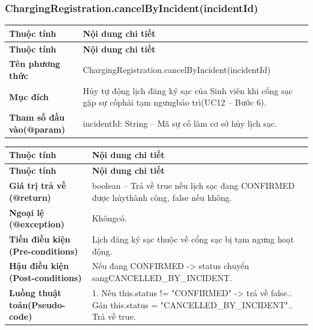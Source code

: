\subsubsection{ChargingRegistration.cancelByIncident(incidentId)}
\begin{longtable}{|L{0.24\textwidth}|L{0.70\textwidth}|}
\hline
\textbf{Thuộc tính} & \textbf{Nội dung chi tiết} \\
\hline
\endfirsthead
\hline
\textbf{Thuộc tính} & \textbf{Nội dung chi tiết} \\
\hline
\endhead
\textbf{Tên phương thức} & ChargingRegistration.cancelByIncident(incidentId) \\
\hline
\textbf{Mục đích} & Hủy tự động lịch đăng ký sạc của Sinh viên khi cổng sạc gặp sự cố\newline phải tạm ngưngbảo trì(UC12 – Bước 6). \\
\hline
\textbf{Tham số đầu vào}\newline \textbf{(@param)} & incidentId: String – Mã sự cố làm cơ sở hủy lịch sạc. \\
\hline
\end{longtable}
\vspace{-0.5\baselineskip}
\begin{longtable}{|L{0.24\textwidth}|L{0.70\textwidth}|}
\hline
\textbf{Thuộc tính} & \textbf{Nội dung chi tiết} \\
\hline
\endfirsthead
\hline
\textbf{Thuộc tính} & \textbf{Nội dung chi tiết} \\
\hline
\endhead
\textbf{Giá trị trả về (@return)} & boolean – Trả về true nếu lịch sạc đang CONFIRMED được hủy\newline thành công, false nếu không. \\
\hline
\textbf{Ngoại lệ (@exception)} & Khôngcó. \\
\hline
\textbf{Tiền điều kiện (Pre-}\newline \textbf{conditions)} & Lịch đăng ký sạc thuộc về cổng sạc bị tạm ngưng hoạt động. \\
\hline
\textbf{Hậu điều kiện (Post-}\newline \textbf{conditions)} & Nếu đang CONFIRMED -> status chuyển sang\newline CANCELLED\_BY\_INCIDENT. \\
\hline
\textbf{Luồng thuật toán}\newline \textbf{(Pseudo-code)} & 1. Nếu this.status != "CONFIRMED" -> trả về false.. Gán this.status = "CANCELLED\_BY\_INCIDENT".. Trả về true. \\
\hline
\end{longtable}
\vspace{-0.5\baselineskip}
